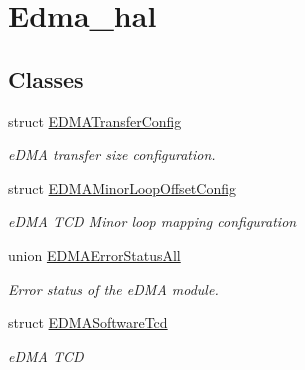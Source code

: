 \hypertarget{group__edma__hal}{}\section{Edma\+\_\+hal}
\label{group__edma__hal}
\subsection*{Classes}
\begin{DoxyCompactItemize}
\item 
struct \hyperlink{structEDMATransferConfig}{E\+D\+M\+A\+Transfer\+Config}
\begin{DoxyCompactList}\small\item\em e\+D\+MA transfer size configuration. \end{DoxyCompactList}\item 
struct \hyperlink{structEDMAMinorLoopOffsetConfig}{E\+D\+M\+A\+Minor\+Loop\+Offset\+Config}
\begin{DoxyCompactList}\small\item\em e\+D\+MA T\+CD Minor loop mapping configuration \end{DoxyCompactList}\item 
union \hyperlink{unionEDMAErrorStatusAll}{E\+D\+M\+A\+Error\+Status\+All}
\begin{DoxyCompactList}\small\item\em Error status of the e\+D\+MA module. \end{DoxyCompactList}\item 
struct \hyperlink{structEDMASoftwareTcd}{E\+D\+M\+A\+Software\+Tcd}
\begin{DoxyCompactList}\small\item\em e\+D\+MA T\+CD \end{DoxyCompactList}\end{DoxyCompactItemize}
